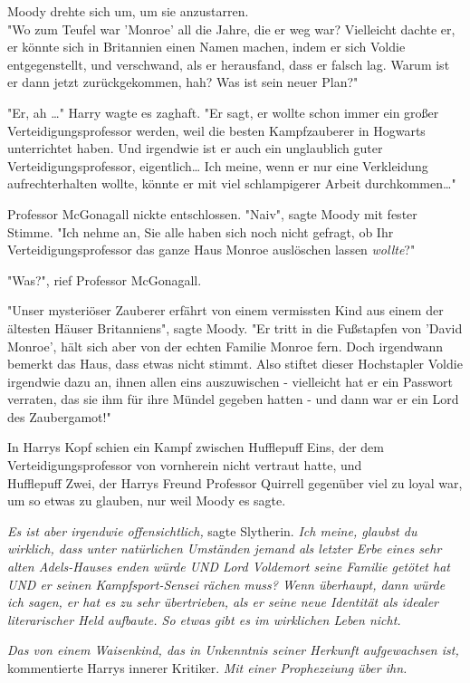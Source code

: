 {Moody drehte sich um, um sie anzustarren.\\ "Wo zum Teufel war 'Monroe' all die Jahre, die er weg war? Vielleicht dachte er, er könnte sich in Britannien einen Namen machen, indem er sich Voldie entgegenstellt, und verschwand, als er herausfand, dass er falsch lag. Warum ist er dann jetzt zurückgekommen, hah? Was ist sein neuer Plan?"

"Er, ah …" Harry wagte es zaghaft. "Er sagt, er wollte schon immer ein großer Verteidigungsprofessor werden, weil die besten Kampfzauberer in Hogwarts unterrichtet haben. Und irgendwie ist er auch ein unglaublich guter Verteidigungsprofessor, eigentlich… Ich meine, wenn er nur eine Verkleidung aufrechterhalten wollte, könnte er mit viel schlampigerer Arbeit durchkommen…"

Professor McGonagall nickte entschlossen. "Naiv", sagte Moody mit fester Stimme. "Ich nehme an, Sie alle haben sich noch nicht gefragt, ob Ihr Verteidigungsprofessor das ganze Haus Monroe auslöschen lassen \emph{wollte}?"

"Was?", rief Professor McGonagall.

"Unser mysteriöser Zauberer erfährt von einem vermissten Kind aus einem der ältesten Häuser Britanniens", sagte Moody. "Er tritt in die Fußstapfen von 'David Monroe', hält sich aber von der echten Familie Monroe fern. Doch irgendwann bemerkt das Haus, dass etwas nicht stimmt. Also stiftet dieser Hochstapler Voldie irgendwie dazu an, ihnen allen eins auszuwischen - vielleicht hat er ein Passwort verraten, das sie ihm für ihre Mündel gegeben hatten - und dann war er ein Lord des Zaubergamot!"

In Harrys Kopf schien ein Kampf zwischen Hufflepuff Eins, der dem Verteidigungsprofessor von vornherein nicht vertraut hatte, und\\ Hufflepuff Zwei, der Harrys Freund Professor Quirrell gegenüber viel zu loyal war, um so etwas zu glauben, nur weil Moody es sagte.

\emph{Es ist aber irgendwie offensichtlich,} sagte Slytherin. \emph{Ich meine, glaubst du wirklich, dass unter natürlichen Umständen jemand als letzter Erbe eines sehr alten Adels-Hauses enden würde UND Lord Voldemort seine Familie getötet hat UND er seinen Kampfsport-Sensei rächen muss? Wenn überhaupt, dann würde ich sagen, er hat es zu sehr übertrieben, als er seine neue Identität als idealer literarischer Held aufbaute. So etwas gibt es im wirklichen Leben nicht.}

\emph{Das von einem Waisenkind, das in Unkenntnis seiner Herkunft aufgewachsen ist,} kommentierte Harrys innerer Kritiker. \emph{Mit einer Prophezeiung über ihn.}

}
